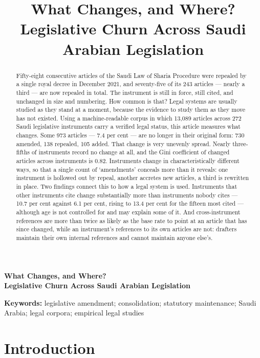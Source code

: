 \documentclass[11pt]{article}
\title{What Changes, and Where?\\
Legislative Churn Across Saudi Arabian Legislation}
\author{}
\date{}
\begin{document}
\begin{center}
{\Large\bfseries What Changes, and Where?\\[2pt]
Legislative Churn Across Saudi Arabian Legislation\par}
\end{center}
\vspace{1em}


\begin{abstract}
\noindent
Fifty-eight consecutive articles of the Saudi Law of Sharia Procedure were
repealed by a single royal decree in December 2021, and seventy-five of its
243 articles --- nearly a third --- are now repealed in total. The instrument
is still in force, still cited, and unchanged in size and numbering. How
common is that? Legal systems are usually studied as they stand at a moment,
because the evidence to study them as they move has not existed. Using a
machine-readable corpus in which 13,089 articles across 272 Saudi legislative
instruments carry a verified legal status, this article measures what
changes. Some 973 articles --- 7.4 per cent --- are no longer in their
original form: 730 amended, 138 repealed, 105 added. That change is very
unevenly spread. Nearly three-fifths of instruments record no change at all,
and the Gini coefficient of changed articles across instruments is 0.82.
Instruments change in characteristically different ways, so that a single
count of `amendments' conceals more than it reveals: one instrument is
hollowed out by repeal, another accretes new articles, a third is rewritten
in place. Two findings connect this to how a legal system is used. Instruments
that other instruments cite change substantially more than instruments nobody
cites --- 10.7 per cent against 6.1 per cent, rising to 13.4 per cent for the
fifteen most cited --- although age is not controlled for and may explain some
of it. And cross-instrument references are more than twice as likely as the
base rate to point at an article that has since changed, while an instrument's
references to its own articles are not: drafters maintain their own internal
references and cannot maintain anyone else's.
\end{abstract}

\vspace{1em}\noindent\textbf{Keywords:} legislative amendment; consolidation;
statutory maintenance; Saudi Arabia; legal corpora; empirical legal studies
\vspace{1.5em}

\section{Introduction}
\end{document}

